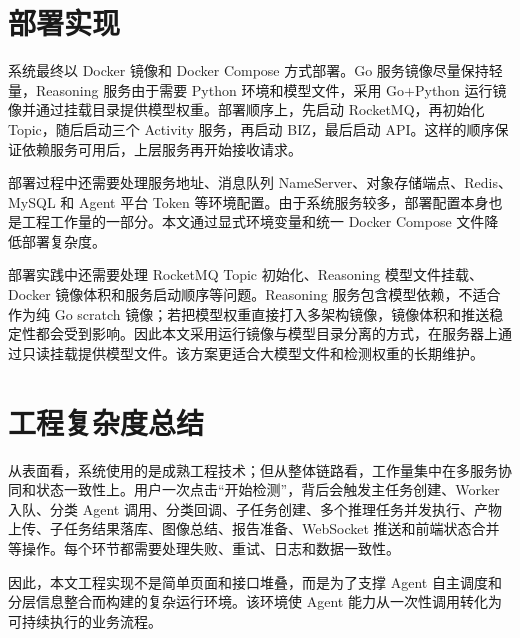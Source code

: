 \section{部署实现}
\label{sec:impl-deployment}

系统最终以 Docker 镜像和 Docker Compose 方式部署。Go 服务镜像尽量保持轻量，Reasoning 服务由于需要 Python 环境和模型文件，采用 Go+Python 运行镜像并通过挂载目录提供模型权重。部署顺序上，先启动 RocketMQ，再初始化 Topic，随后启动三个 Activity 服务，再启动 BIZ，最后启动 API。这样的顺序保证依赖服务可用后，上层服务再开始接收请求。

部署过程中还需要处理服务地址、消息队列 NameServer、对象存储端点、Redis、MySQL 和 Agent 平台 Token 等环境配置。由于系统服务较多，部署配置本身也是工程工作量的一部分。本文通过显式环境变量和统一 Docker Compose 文件降低部署复杂度。

部署实践中还需要处理 RocketMQ Topic 初始化、Reasoning 模型文件挂载、Docker 镜像体积和服务启动顺序等问题。Reasoning 服务包含模型依赖，不适合作为纯 Go scratch 镜像；若把模型权重直接打入多架构镜像，镜像体积和推送稳定性都会受到影响。因此本文采用运行镜像与模型目录分离的方式，在服务器上通过只读挂载提供模型文件。该方案更适合大模型文件和检测权重的长期维护。

\section{工程复杂度总结}
\label{sec:impl-complexity-summary}

从表面看，系统使用的是成熟工程技术；但从整体链路看，工作量集中在多服务协同和状态一致性上。用户一次点击“开始检测”，背后会触发主任务创建、Worker 入队、分类 Agent 调用、分类回调、子任务创建、多个推理任务并发执行、产物上传、子任务结果落库、图像总结、报告准备、WebSocket 推送和前端状态合并等操作。每个环节都需要处理失败、重试、日志和数据一致性。

因此，本文工程实现不是简单页面和接口堆叠，而是为了支撑 Agent 自主调度和分层信息整合而构建的复杂运行环境。该环境使 Agent 能力从一次性调用转化为可持续执行的业务流程。

